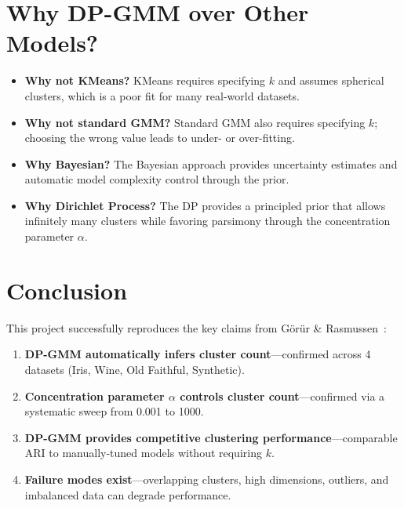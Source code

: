 \documentclass[conference]{IEEEtran}
\begin{document}
\section{Why DP-GMM over Other Models?}

\begin{itemize}
    \item \textbf{Why not KMeans?} KMeans requires specifying $k$ and assumes spherical clusters, which is a poor fit for many real-world datasets.
    \item \textbf{Why not standard GMM?} Standard GMM also requires specifying $k$; choosing the wrong value leads to under- or over-fitting.
    \item \textbf{Why Bayesian?} The Bayesian approach provides uncertainty estimates and automatic model complexity control through the prior.
    \item \textbf{Why Dirichlet Process?} The DP provides a principled prior that allows infinitely many clusters while favoring parsimony through the concentration parameter $\alpha$.
\end{itemize}

\section{Conclusion}

This project successfully reproduces the key claims from G\"{o}r\"{u}r \& Rasmussen~\cite{goeruer2010}:

\begin{enumerate}
    \item \textbf{DP-GMM automatically infers cluster count}---confirmed across 4 datasets (Iris, Wine, Old Faithful, Synthetic).
    \item \textbf{Concentration parameter $\alpha$ controls cluster count}---confirmed via a systematic sweep from 0.001 to 1000.
    \item \textbf{DP-GMM provides competitive clustering performance}---comparable ARI to manually-tuned models without requiring $k$.
    \item \textbf{Failure modes exist}---overlapping clusters, high dimensions, outliers, and imbalanced data can degrade performance.
\end{enumerate}
\end{document}
